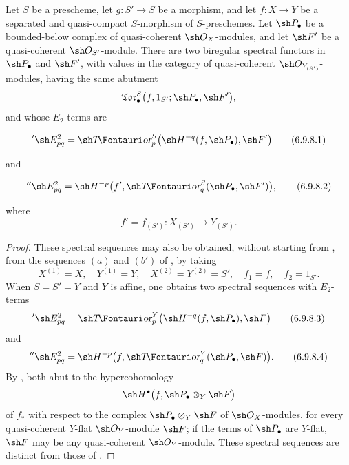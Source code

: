 \begin{proposition}[6.9.8]
\label{III.6.9.8}
Let $S$ be a prescheme, let $g:S'\to S$ be a morphism, and let
$f:X\to Y$ be a separated and quasi-compact $S$-morphism of
$S$-preschemes.  Let $\sh P_\bullet$ be a bounded-below complex of
quasi-coherent $\sh O_X$-modules, and let $\sh F'$ be a
quasi-coherent $\sh O_{S'}$-module.  There are two biregular
spectral functors in $\sh P_\bullet$ and $\sh F'$, with values in
the category of quasi-coherent $\sh O_{Y_{(S')}}$-modules, having
the same abutment
\[
  \mathfrak{Tor}_\bullet^S
  \bigl(
    f,1_{S'};\sh P_\bullet,\sh F'
  \bigr),
\]
and whose $E_2$-terms are
\begin{env}[6.9.8.1]
\label{III.6.9.8.1}
\[
  {}'\sh E_{pq}^2
  =
  \shTor_p^S
  \bigl(
    \sh H^{-q}(f,\sh P_\bullet),\sh F'
  \bigr)
  \tag{6.9.8.1}\label{III.6.9.8.1.eq}
\]
\end{env}
and
\begin{env}[6.9.8.2]
\label{III.6.9.8.2}
\[
  {}''\sh E_{pq}^2
  =
  \sh H^{-p}
  \bigl(
    f',
    \shTor_q^S(\sh P_\bullet,\sh F')
  \bigr),
  \tag{6.9.8.2}\label{III.6.9.8.2.eq}
\]
\end{env}
where
\[
  f'=f_{(S')}:
  X_{(S')}\longrightarrow Y_{(S')}.
\]
\end{proposition}

\begin{proof}
These spectral sequences may also be obtained, without starting
from , from the sequences $(a)$ and $(b')$ of
, by taking
\[
  X^{(1)}=X,\quad
  Y^{(1)}=Y,\quad
  X^{(2)}=Y^{(2)}=S',\quad
  f_1=f,\quad
  f_2=1_{S'}.
\]
When $S=S'=Y$ and $Y$ is affine, one obtains two spectral
sequences with $E_2$-terms
\[
  {}'\sh E_{pq}^2
  =
  \shTor_p^Y
  \bigl(
    \sh H^{-q}(f,\sh P_\bullet),\sh F
  \bigr)
  \tag{6.9.8.3}\label{III.6.9.8.3}
\]
and
\[
  {}''\sh E_{pq}^2
  =
  \sh H^{-p}
  \bigl(
    f,\shTor_q^Y(\sh P_\bullet,\sh F)
  \bigr).
  \tag{6.9.8.4}\label{III.6.9.8.4}
\]
By , both abut to the hypercohomology
\[
  \sh H^\bullet
  \bigl(
    f,\sh P_\bullet\otimes_Y\sh F
  \bigr)
\]
of $f_*$ with respect to the complex
$\sh P_\bullet\otimes_Y\sh F$ of $\sh O_X$-modules, for every
quasi-coherent $Y$-flat $\sh O_Y$-module $\sh F$; if the terms of
$\sh P_\bullet$ are $Y$-flat, $\sh F$ may be any quasi-coherent
$\sh O_Y$-module.  These spectral sequences are distinct from
those of .
\end{proof}

